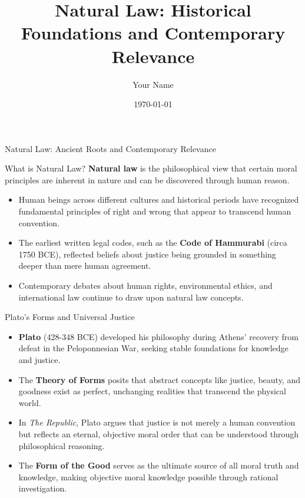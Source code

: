 \documentclass{beamer}
\title{Natural Law: Historical Foundations and Contemporary Relevance}
\author{Your Name}
\date{\today}
\begin{document}
\begin{frame}
    \titlepage
\end{frame}

\begin{frame}{Natural Law: Ancient Roots and Contemporary Relevance}
    \begin{alertblock}{What is Natural Law?}
        \textbf{Natural law} is the philosophical view that certain moral principles are inherent in nature and can be discovered through human reason.
    \end{alertblock}
    
    \begin{itemize}
        \item Human beings across different cultures and historical periods have recognized fundamental principles of right and wrong that appear to transcend human convention.
        
        \item The earliest written legal codes, such as the \textbf{Code of Hammurabi} (circa 1750 BCE), reflected beliefs about justice being grounded in something deeper than mere human agreement.
        
        \item Contemporary debates about human rights, environmental ethics, and international law continue to draw upon natural law concepts.
    \end{itemize}
\end{frame}

\begin{frame}{Plato's Forms and Universal Justice}
    \begin{itemize}
        \item \textbf{Plato} (428-348 BCE) developed his philosophy during Athens' recovery from defeat in the Peloponnesian War, seeking stable foundations for knowledge and justice.
        
        \item The \textbf{Theory of Forms} posits that abstract concepts like justice, beauty, and goodness exist as perfect, unchanging realities that transcend the physical world.
        
        \item In \textit{The Republic}, Plato argues that justice is not merely a human convention but reflects an eternal, objective moral order that can be understood through philosophical reasoning.
        
        \item The \textbf{Form of the Good} serves as the ultimate source of all moral truth and knowledge, making objective moral knowledge possible through rational investigation.
    \end{itemize}
\end{frame}
\end{document}
